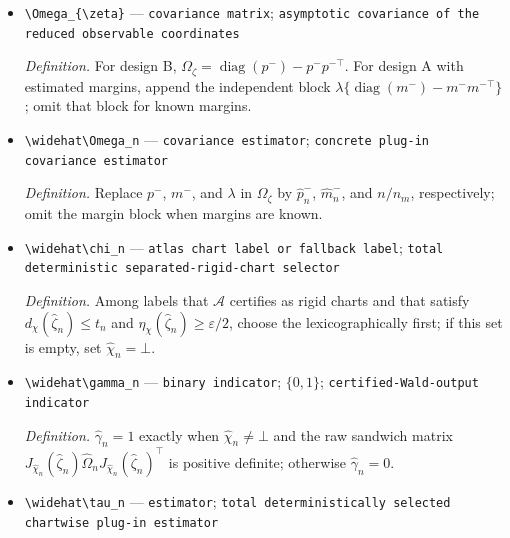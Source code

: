 \documentclass{article}
\begin{document}
\begin{itemize}
  \par\smallskip\noindent\emph{Definition.} The reduced-coordinate vector formed from \(\widehat p_n\) and, in design A, \(\widehat m_n\).
  \item \texttt{\textbackslash{}\allowbreak{}Omega\_\allowbreak{}\{\textbackslash{}\allowbreak{}zeta\}\allowbreak{}} --- \texttt{covariance matrix}; \texttt{asymptotic covariance of the reduced observable coordinates}
  \par\smallskip\noindent\emph{Definition.} For design B, \(\Omega_{\zeta}=\operatorname{diag}(p^{-})-p^{-}p^{-\top}\). For design A with estimated margins, append the independent block \(\lambda\{\operatorname{diag}(m^{-})-m^{-}m^{-\top}\}\); omit that block for known margins.
  \item \texttt{\textbackslash{}\allowbreak{}widehat\textbackslash{}\allowbreak{}Omega\_\allowbreak{}n} --- \texttt{covariance estimator}; \texttt{concrete plug-\allowbreak{}in covariance estimator}
  \par\smallskip\noindent\emph{Definition.} Replace \(p^{-}\), \(m^{-}\), and \(\lambda\) in \(\Omega_{\zeta}\) by \(\widehat p_n^{-}\), \(\widehat m_n^{-}\), and \(n/n_m\), respectively; omit the margin block when margins are known.
  \item \texttt{\textbackslash{}\allowbreak{}widehat\textbackslash{}\allowbreak{}chi\_\allowbreak{}n} --- \texttt{atlas chart label or fallback label}; \texttt{total deterministic separated-\allowbreak{}rigid-\allowbreak{}chart selector}
  \par\smallskip\noindent\emph{Definition.} Among labels that \(\mathscr A\) certifies as rigid charts and that satisfy \(d_{\chi}(\widehat\zeta_n)\le t_n\) and \(\eta_{\chi}(\widehat\zeta_n)\ge\varepsilon/2\), choose the lexicographically first; if this set is empty, set \(\widehat\chi_n=\bot\).
  \item \texttt{\textbackslash{}\allowbreak{}widehat\textbackslash{}\allowbreak{}gamma\_\allowbreak{}n} --- \texttt{binary indicator}; \(\{0,1\}\); \texttt{certified-\allowbreak{}Wald-\allowbreak{}output indicator}
  \par\smallskip\noindent\emph{Definition.} \(\widehat\gamma_n=1\) exactly when \(\widehat\chi_n\ne\bot\) and the raw sandwich matrix \(J_{\widehat\chi_n}(\widehat\zeta_n)\widehat\Omega_nJ_{\widehat\chi_n}(\widehat\zeta_n)^{\top}\) is positive definite; otherwise \(\widehat\gamma_n=0\).
  \item \texttt{\textbackslash{}\allowbreak{}widehat\textbackslash{}\allowbreak{}tau\_\allowbreak{}n} --- \texttt{estimator}; \texttt{total deterministically selected chartwise plug-\allowbreak{}in estimator}

\end{itemize}
\end{document}

